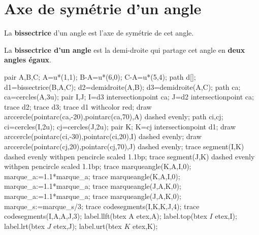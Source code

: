 \section{Axe de symétrie d'un angle}
\begin{definition}
    La \textbf{bissectrice}  d'un angle est l'axe de symétrie de cet angle.
\end{definition}

\begin{propriete}[\admise]
    La \textbf{bissectrice d'un angle} est la demi-droite qui partage cet angle en \textbf{deux angles égaux}.
\end{propriete}

\begin{changemargin}{-10mm}{-10mm}
\begin{minipage}{0.4\linewidth}
    \begin{Geometrie}[CoinHD={u*(7,7)}]
        pair A,B,C;
        A=u*(1,1);
        B-A=u*(6,0);
        C-A=u*(5,4);        
        path d[];
        d1=bissectrice(B,A,C);
        d2=demidroite(A,B);
        d3=demidroite(A,C);
        path ca;
        ca=cercles(A,3u);
        pair I,J;
        I=d3 intersectionpoint ca;
        J=d2 intersectionpoint ca;
        trace d2;
        trace d3;
        trace d1 withcolor red;
        draw arccercle(pointarc(ca,-20),pointarc(ca,70),A) dashed evenly;
        path ci,cj;
        ci=cercles(I,2u);
        cj=cercles(J,2u);
        pair K;
        K=cj intersectionpoint d1;
        draw arccercle(pointarc(ci,-30),pointarc(ci,20),I) dashed evenly;
        draw arccercle(pointarc(cj,20),pointarc(cj,70),J) dashed evenly;
        trace segment(I,K) dashed evenly withpen pencircle scaled 1.1bp;
        trace segment(J,K) dashed evenly withpen pencircle scaled 1.1bp;
        trace marqueangle(K,A,I,0);
        marque_a:=1.1*marque_a;
        trace marqueangle(K,A,I,0);
        marque_a:=1.1*marque_a;
        trace marqueangle(J,A,K,0);
        marque_a:=1.1*marque_a;
        trace marqueangle(J,A,K,0);
        marque_s:=marque_s/3;
        trace codesegments(I,K,K,J,4);
        trace codesegments(I,A,A,J,3);
        label.llft(btex A etex,A);
        label.top(btex $I$ etex,I);
        label.lrt(btex $J$ etex,J);
        label.urt(btex $K$ etex,K);
    \end{Geometrie}
\end{minipage}
\begin{minipage}{0.55\linewidth}
\begin{center}
    \begin{myBox}{}
        \begin{flushleft}        


\end{flushleft}
\end{myBox}
\end{center}
\end{minipage}
\end{changemargin}
